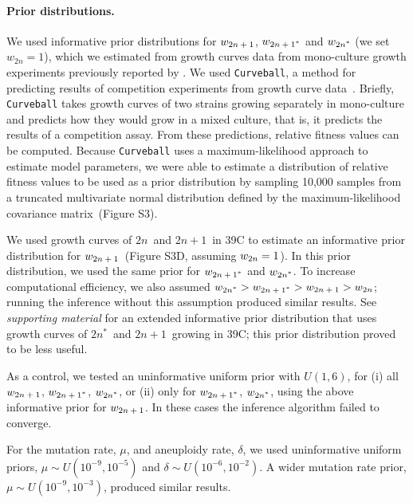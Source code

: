 \documentclass[12pt]{article}
\newcommand{\euwt}{\emph{$2n$}}
\newcommand{\anwt}{\emph{$2n+1$}}
\newcommand{\eumt}{\emph{$2n^*$}}
\newcommand{\anmt}{\emph{$2n+1^*$}}
\begin{document}
\paragraph{Prior distributions.} \label{par:prior}
We used informative prior distributions for $w_{\anwt}$, $w_{\anmt}$ and $w_{\eumt}$ (we set $w_{2n}=1$), which we estimated from growth curves data from mono-culture growth experiments previously reported by \citet[Figs. 3C, 4A, and S2]{Yona2012}.
We used \texttt{Curveball}, a method for predicting results of competition experiments from growth curve data~\citep[\href{https://curveball.yoavram.com}{curveball.yoavram.com}]{Ram2019}. Briefly, \texttt{Curveball} takes growth curves of two strains growing separately in mono-culture and predicts how they would grow in a mixed culture, that is, it predicts the results of a competition assay.
From these predictions, relative fitness values can be computed. Because \texttt{Curveball} uses a maximum-likelihood approach to estimate model parameters, we were able to estimate a distribution of relative fitness values to be used as a prior distribution by sampling 10,000 samples from a truncated multivariate normal distribution defined by the maximum-likelihood covariance matrix~(Figure S3).

We used growth curves of \euwt\ and \anwt\ in 39\degree C to estimate an informative prior distribution for $w_{\anwt}$~(Figure S3D, assuming $w_{\euwt}=1$).
In this prior distribution, we used the same prior for $w_{\anmt}$ and $w_{\eumt}$. 
To increase computational efficiency, we also assumed $w_\eumt>w_\anmt>w_\anwt>w_\euwt$; running the inference without this assumption produced similar results.
See \emph{supporting material} for an extended informative prior distribution that uses growth curves of \eumt\ and \anwt\ growing in 39\degree C; this prior distribution proved to be less useful.

As a control, we tested an uninformative uniform prior with $\mathit{U}(1,6)$, for (i) all $w_{\anwt}$, $w_{\anmt}$, $w_{\eumt}$, or (ii) only for $w_{\anmt}$, $w_{\eumt}$, using the above informative prior for $w_{\anwt}$. In these cases the inference algorithm failed to converge.
 
For the mutation rate, $\mu$, and aneuploidy rate, $\delta$, we used uninformative uniform priors, $\mu \sim \mathit{U}(10^{-9},10^{-5})$ and $\delta \sim \mathit{U}(10^{-6},10^{-2})$. A wider mutation rate prior, $\mu \sim \mathit{U}(10^{-9},10^{-3})$, produced similar results.


\end{document}
